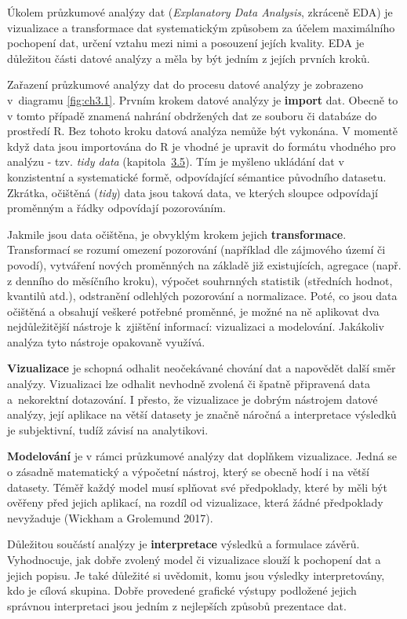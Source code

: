 \documentclass[12pt,]{article}
\begin{document}
\qquad Úkolem průzkumové analýzy dat (\emph{Explanatory Data Analysis},
zkráceně EDA) je vizualizace a transformace dat systematickým způsobem
za účelem maximálního pochopení dat, určení vztahu mezi nimi a posouzení
jejích kvality. EDA je důležitou části datové analýzy a měla by být
jedním z jejích prvních kroků.

\qquad Zařazení průzkumové analýzy dat do procesu datové analýzy je
zobrazeno v~diagramu \ref{fig:ch3.1}. Prvním krokem datové analýzy je
\textbf{import} dat. Obecně to v tomto případě znamená nahrání
obdržených dat ze souboru či databáze do prostředí R. Bez tohoto kroku
datová analýza nemůže být vykonána. V momentě když data jsou importována
do R je vhodné je upravit do formátu vhodného pro analýzu - tzv.
\emph{tidy data} (kapitola~\protect\hyperlink{tidydata}{3.5}). Tím je
myšleno ukládání dat v konzistentní a systematické formě, odpovídající
sémantice původního datasetu. Zkrátka, očištěná (\emph{tidy}) data jsou
taková data, ve kterých sloupce odpovídají proměnným a řádky odpovídají
pozorováním.

\qquad Jakmile jsou data očištěna, je obvyklým krokem jejich
\textbf{transformace}. Transformací se rozumí omezení pozorování
(například dle zájmového území či povodí), vytváření nových proměnných
na základě již existujících, agregace (např. z denního do měsíčního
kroku), výpočet souhrnných statistik (středních hodnot, kvantilů atd.),
odstranění odlehlých pozorování a normalizace. Poté, co jsou data
očištěná a obsahují veškeré potřebné proměnné, je možné na ně aplikovat
dva nejdůležitější nástroje k~zjištění informací: vizualizaci a
modelování. Jakákoliv analýza tyto nástroje opakovaně využívá.

\qquad \textbf{Vizualizace} je schopná odhalit neočekávané chování dat a
napovědět další směr analýzy. Vizualizaci lze odhalit nevhodně zvolená
či špatně připravená data a~nekorektní dotazování. I přesto, že
vizualizace je dobrým nástrojem datové analýzy, její aplikace na větší
datasety je značně náročná a interpretace výsledků je subjektivní, tudíž
závisí na analytikovi.

\qquad \textbf{Modelování} je v rámci průzkumové analýzy dat doplňkem
vizualizace. Jedná se o zásadně matematický a výpočetní nástroj, který
se obecně hodí i na větší datasety. Téměř každý model musí splňovat své
předpoklady, které by měli být ověřeny před jejich aplikací, na rozdíl
od vizualizace, která žádné předpoklady nevyžaduje (Wickham a Grolemund
2017).

\qquad Důležitou součástí analýzy je \textbf{interpretace} výsledků a
formulace závěrů. Vyhodnocuje, jak dobře zvolený model či vizualizace
slouží k pochopení dat a jejich popisu. Je také důležité si uvědomit,
komu jsou výsledky interpretovány, kdo je cílová skupina. Dobře
provedené grafické výstupy podložené jejich správnou interpretaci jsou
jedním z nejlepších způsobů prezentace dat.
\end{document}
